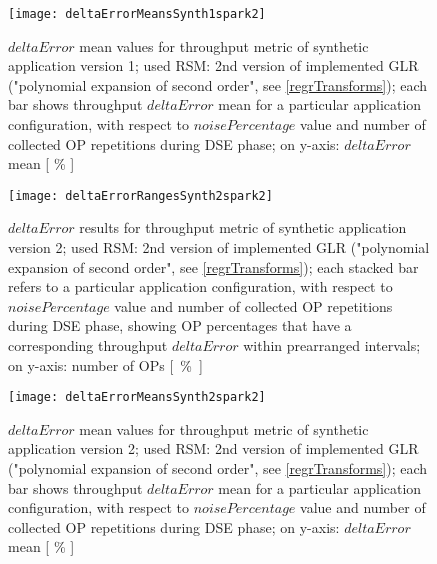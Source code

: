 \begin{figure}[H]

    \centering
    
    \texttt{[image: deltaErrorMeansSynth1spark2]}
    
    \caption{$deltaError$ mean values for throughput metric of synthetic application version 1; used RSM: 2nd version of implemented GLR ("polynomial expansion of second order", see \ref{regrTransforms}); each bar shows throughput $deltaError$ mean for a particular application configuration, with respect to $noisePercentage$ value and number of collected OP repetitions during DSE phase; on y-axis: $deltaError$ mean [ \% ]}
    
    \label{fig::synth1spark2::means}
    
\end{figure}





\begin{figure}[H]

    \centering
    
    \texttt{[image: deltaErrorRangesSynth2spark2]}
    
     \caption{$deltaError$ results for throughput metric of synthetic application version 2; used RSM: 2nd version of implemented GLR ("polynomial expansion of second order", see \ref{regrTransforms}); each stacked bar refers to a particular application configuration, with respect to $noisePercentage$ value and number of collected OP repetitions during DSE phase, showing OP percentages that have a corresponding throughput $deltaError$ within prearranged intervals; on y-axis: number of OPs \hbox{[ \% ]}}
    
    \label{fig::synth2spark2::intervals}
    
\end{figure}

\begin{figure}[H]

    \centering
    
    \texttt{[image: deltaErrorMeansSynth2spark2]}
    
    \caption{$deltaError$ mean values for throughput metric of synthetic application version 2; used RSM: 2nd version of implemented GLR ("polynomial expansion of second order", see \ref{regrTransforms}); each bar shows throughput $deltaError$ mean for a particular application configuration, with respect to $noisePercentage$ value and number of collected OP repetitions during DSE phase; on y-axis: $deltaError$ mean [ \% ]}
    
    \label{fig::synth2spark2::means}
    
\end{figure}






